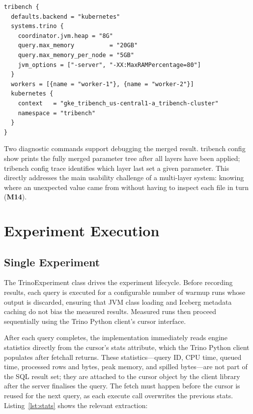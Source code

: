 \documentclass{l4proj}
\begin{document}
\begin{lstlisting}[style=hoconStyle, caption={GCP GKE host profile, illustrating the sparse-override pattern.}]
tribench {
  defaults.backend = "kubernetes"
  systems.trino {
    coordinator.jvm.heap = "8G"
    query.max_memory          = "20GB"
    query.max_memory_per_node = "5GB"
    jvm_options = ["-server", "-XX:MaxRAMPercentage=80"]
  }
  workers = [{name = "worker-1"}, {name = "worker-2"}]
  kubernetes {
    context   = "gke_tribench_us-central1-a_tribench-cluster"
    namespace = "tribench"
  }
}
\end{lstlisting}

Two diagnostic commands support debugging the merged result. tribench config show prints the fully merged parameter tree after all layers have been applied; tribench config trace identifies which layer last set a given parameter. This directly addresses the main usability challenge of a multi-layer system: knowing where an unexpected value came from without having to inspect each file in turn (\textbf{M14}).

\section{Experiment Execution}
\label{sec:impl_execution}

\subsection{Single Experiment}
\label{sec:impl_single_exp}

The TrinoExperiment class drives the experiment lifecycle. Before recording results, each query is executed for a configurable number of warmup runs whose output is discarded, ensuring that JVM class loading and Iceberg metadata caching do not bias the measured results. Measured runs then proceed sequentially using the Trino Python client's cursor interface.

After each query completes, the implementation immediately reads engine statistics directly from the cursor's stats attribute, which the Trino Python client populates after fetchall returns. These statistics---query ID, CPU time, queued time, processed rows and bytes, peak memory, and spilled bytes---are not part of the SQL result set; they are attached to the cursor object by the client library after the server finalises the query. The fetch must happen before the cursor is reused for the next query, as each execute call overwrites the previous stats. Listing~\ref{lst:stats} shows the relevant extraction:
\end{document}
